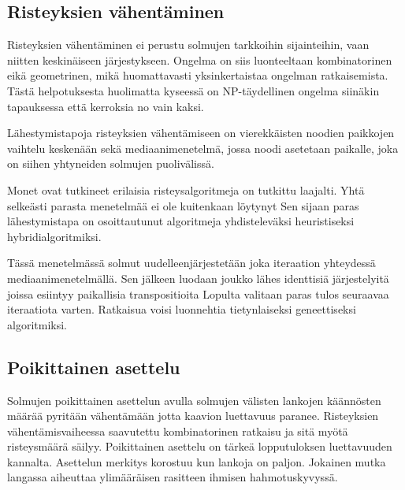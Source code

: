 \documentclass[finnish,12pt]{article}
\begin{document}
		\subsection{Risteyksien vähentäminen}

Risteyksien vähentäminen ei perustu solmujen tarkkoihin sijainteihin, vaan
niitten keskinäiseen järjestykseen. Ongelma on siis luonteeltaan kombinatorinen
eikä geometrinen, mikä huomattavasti yksinkertaistaa ongelman ratkaisemista.
Tästä helpotuksesta huolimatta kyseessä on NP-täydellinen ongelma siinäkin
tapauksessa että kerroksia no vain kaksi. \cite{RefWorks:40}

Lähestymistapoja risteyksien vähentämiseen on vierekkäisten noodien paikkojen
vaihtelu keskenään sekä mediaanimenetelmä, jossa noodi asetetaan paikalle, joka
on siihen yhtyneiden solmujen puolivälissä.

Monet ovat tutkineet erilaisia risteysalgoritmeja on tutkittu laajalti.
Yhtä selkeästi parasta menetelmää ei ole kuitenkaan löytynyt
Sen sijaan paras lähestymistapa on osoittautunut algoritmeja
yhdisteleväksi heuristiseksi hybridialgoritmiksi.

Tässä menetelmässä solmut uudelleenjärjestetään joka iteraation yhteydessä mediaanimenetelmällä. Sen jälkeen 
luodaan joukko lähes identtisiä järjestelyitä joissa esiintyy paikallisia transpositioita
Lopulta valitaan paras tulos seuraavaa iteraatiota varten.
Ratkaisua voisi luonnehtia tietynlaiseksi geneettiseksi algoritmiksi.


		\subsection{Poikittainen asettelu}

Solmujen poikittainen asettelun avulla solmujen välisten lankojen käännösten
määrää pyritään vähentämään jotta kaavion luettavuus paranee.
Risteyksien vähentämisvaiheessa saavutettu kombinatorinen ratkaisu ja sitä myötä
risteysmäärä säilyy.
Poikittainen asettelu on tärkeä lopputuloksen luettavuuden kannalta. Asettelun merkitys korostuu kun lankoja on paljon.
Jokainen mutka langassa aiheuttaa ylimääräisen rasitteen ihmisen hahmotuskyvyssä.

\clearpage
{} %
 
\end{document}
